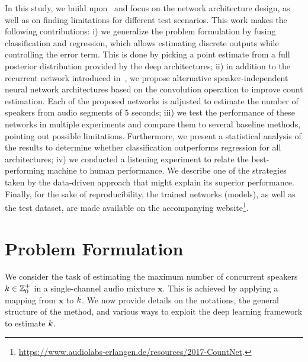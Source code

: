 In this study, we build upon~\cite{stoeter17} and focus on the network architecture design, as well as on finding limitations for different test scenarios.
This work makes the following contributions:
i) we generalize the problem formulation by fusing classification and regression, which allows estimating discrete outputs while controlling the error term. This is done by picking a point estimate from a full posterior distribution provided by the deep architectures;
ii) in addition to the recurrent network introduced in~\cite{stoeter17}, we propose alternative speaker-independent neural network architectures based on the convolution operation to improve count estimation.
Each of the proposed networks is adjusted to estimate the number of speakers from audio segments of 5 seconds;
iii) we test the performance of these networks in multiple experiments and compare them to several baseline methods, pointing out possible limitations.
Furthermore, we present a statistical analysis of the results to determine whether classification outperforms regression for all architectures;
iv) we conducted a listening experiment to relate the best-performing machine to human performance.
We describe one of the strategies taken by the data-driven approach that might explain its superior performance.
Finally, for the sake of reproducibility, the trained networks (models), as well as the test dataset, are made available on the accompanying website\footnote{\url{https://www.audiolabs-erlangen.de/resources/2017-CountNet}.}.


\section{Problem Formulation}%
\label{sec:problem_formulation}
We consider the task of estimating the maximum number of concurrent speakers \( k \in \mathbb{Z}^{+}_{0} \) in a single-channel audio mixture \(\mathbf{x}\).
This is achieved by applying a mapping from \(\mathbf{x}\) to \(k \).
We now provide details on the notations, the general structure of the method, and various ways to exploit the deep learning framework to estimate \(k \).

